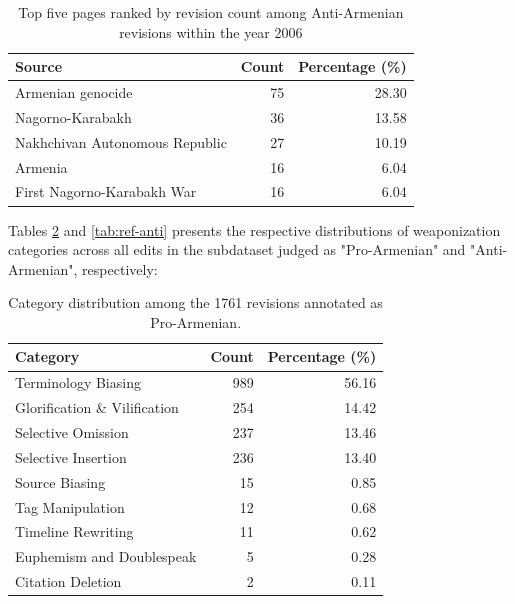 \documentclass[11pt, a4paper, twoside, openright]{article} %
\begin{document}
\begin{table}[h!]
\centering
\begin{tabular}{@{}lrr@{}}  %
\toprule
\textbf{Source} & \textbf{Count} & \textbf{Percentage (\%)} \\
\midrule
Armenian genocide & 75 & 28.30 \\
Nagorno-Karabakh & 36 & 13.58 \\
Nakhchivan Autonomous Republic & 27 & 10.19 \\
Armenia & 16 & 6.04 \\
First Nagorno-Karabakh War & 16 & 6.04 \\
\bottomrule
\end{tabular}
\caption{Top five pages ranked by revision count among Anti-Armenian revisions within the year 2006}
\label{tab:anti-2006}
\end{table}


Tables \ref{tab:ref-pro} and \ref{tab:ref-anti} presents the respective distributions of weaponization categories across all edits in the subdataset judged as "Pro-Armenian" and "Anti-Armenian", respectively:

\begin{table}[h!]
\centering
\begin{tabular}{@{}lrr@{}}  %
\toprule
\textbf{Category} & \textbf{Count} & \textbf{Percentage (\%)} \\
\midrule
Terminology Biasing & 989 & 56.16 \\
Glorification \& Vilification & 254 & 14.42 \\
Selective Omission & 237 & 13.46 \\
Selective Insertion & 236 & 13.40 \\
Source Biasing & 15 & 0.85 \\
Tag Manipulation & 12 & 0.68 \\
Timeline Rewriting & 11 & 0.62 \\
Euphemism and Doublespeak & 5 & 0.28 \\
Citation Deletion & 2 & 0.11 \\
\bottomrule
\end{tabular}
\caption{Category distribution among the 1761 revisions annotated as Pro-Armenian.}
\label{tab:ref-pro}
\end{table}
\end{document}
